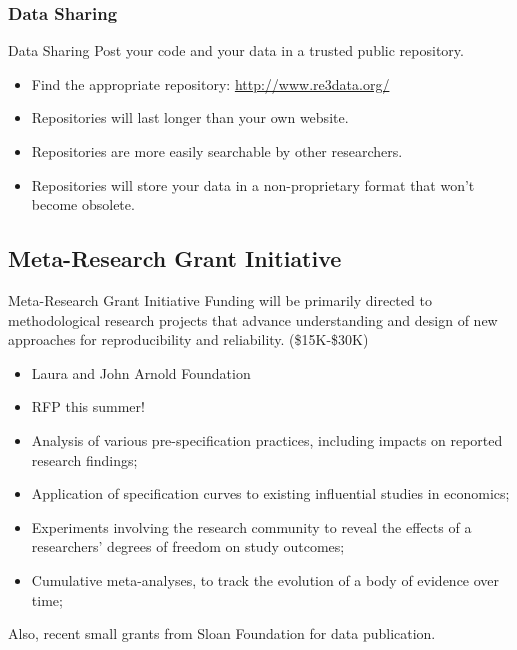 \documentclass{beamer}
\begin{document}
\subsubsection*{Data Sharing}
\begin{frame}{Data Sharing}
Post your code and your data in a trusted public repository.
\begin{itemize}[<.->]
\item
Find the appropriate repository: \url{http://www.re3data.org/}
\item
Repositories will last longer than your own website.
\item
Repositories are more easily searchable by other researchers.
\item
Repositories will store your data in a non-proprietary format that won't become obsolete.
\end{itemize}
\end{frame}
\subsection{Meta-Research Grant Initiative}
\begin{frame}{Meta-Research Grant Initiative}
Funding will be primarily directed to methodological research projects that advance understanding and design of new approaches for reproducibility and reliability. (\$15K-\$30K)
\begin{itemize}
\item Laura and John Arnold Foundation
\item RFP this summer!
\item Analysis of various pre-specification practices, including impacts on reported research findings;
\item Application of specification curves to existing influential studies in economics;
\item Experiments involving the research community to reveal the effects of a researchers’ degrees of freedom on study outcomes;
\item Cumulative meta-analyses, to track the evolution of a body of evidence over time;
\end{itemize}

Also, recent small grants from Sloan Foundation for data publication.

\end{frame}

\end{document}
